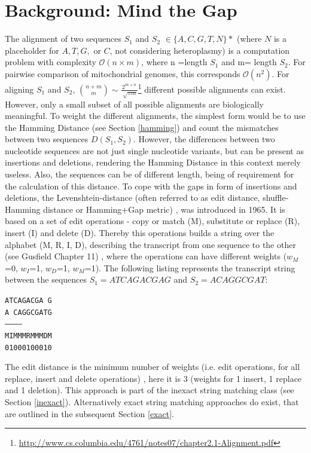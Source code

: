 \section{Background: Mind the Gap}
The alignment of two sequences $S_1$ and $S_2$ $\in \{A,C,G,T,N\}*$ (where $N$ is a placeholder for $A, T, G,$ or $C$, not considering heteroplasmy) is a computation problem with complexity $\mathcal{O}(n \times m)$, where n =length $S_1$ and m= length $S_2$. For pairwise comparison of mitochondrial genomes, this corresponds $\mathcal{O}({n}^{2})$. For aligning $S_1$ and $S_2$, $\binom{n+m}{m} \sim \frac{ {2}^{m  + n}}{\sqrt[]{\pi m}}$\footnote{\url{http://www.cs.columbia.edu/4761/notes07/chapter2.1-Alignment.pdf}} different possible alignments can exist. However, only a small subset of all possible alignments are biologically meaningful. To weight the different alignments, the simplest form would be to use the Hamming Distance (see Section \ref{hamming}) and count the mismatches between two sequences $D(S_1,S_2)$. However, the differences between two nucleotide sequences are not just single nucleotide variants, but can be present as insertions and deletions, rendering the Hamming Distance in this context merely useless. Also, the sequences can be of different length, being of requirement for the calculation of this distance. To cope with the gaps in form of insertions and deletions, the Levenshtein-distance (often referred to as edit distance, shuffle-Hamming distance or Hamming+Gap metric) \cite{Deza2009}, was introduced in 1965. It is based on a set of edit operations - copy or match (M), substitute or replace (R), insert (I) and delete (D). Thereby this operations builds a string over the alphabet (M, R, I, D), describing the transcript from one sequence to the other (see Gusfield Chapter 11) \cite{Gusfield1997}, where the operations can have different weights ($w_M$=0, $w_I$=1, $w_D$=1, $w_M$=1). The following listing represents the transcript string between the sequences $S_1 = ATCAGACGAG$ and $S_2 = ACAGGCGAT$:
\begin{center}
\texttt{ATCAGACGA G} \\
\texttt{A CAGGCGATG} \\
\texttt{-----------} \\
\texttt{MIMMMRMMMDM} \\
\texttt{01000100010} \\
\end{center}
The edit distance is the minimum number of weights (i.e. edit operations, for all replace, insert and delete operations) \cite{Gusfield1997}, here it is 3 (weights for 1 insert, 1 replace and 1 deletion). This approach is part of the inexact string matching class (see Section \ref{inexact}). Alternatively exact string matching approaches do exist, that are outlined in the subsequent Section \ref{exact}. 

